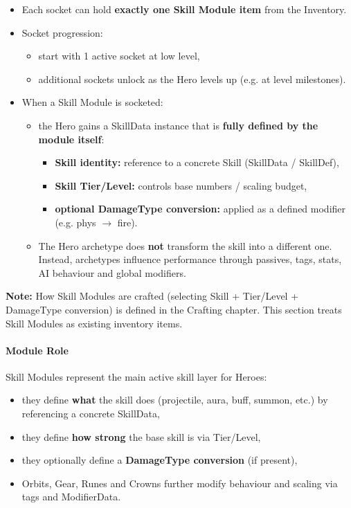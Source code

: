 \begin{itemize}
\begin{tabular}{llll}
	\end{tabular}
	\item Each socket can hold \textbf{exactly one Skill Module item} from the Inventory.
	\item Socket progression:
	\begin{itemize}
		\item start with 1 active socket at low level,
		\item additional sockets unlock as the Hero levels up (e.g. at level milestones).
	\end{itemize}
	\item When a Skill Module is socketed:
	\begin{itemize}
		\item the Hero gains a SkillData instance that is \textbf{fully defined by the module itself}:
		\begin{itemize}
			\item \textbf{Skill identity:} reference to a concrete Skill (SkillData / SkillDef),
			\item \textbf{Skill Tier/Level:} controls base numbers / scaling budget,
			\item \textbf{optional DamageType conversion:} applied as a defined modifier (e.g. phys $\rightarrow$ fire).
		\end{itemize}
		\item The Hero archetype does \textbf{not} transform the skill into a different one.
		Instead, archetypes influence performance through passives, tags, stats, AI behaviour and global modifiers.
	\end{itemize}
\end{itemize}

\noindent
\textbf{Note:} How Skill Modules are crafted (selecting Skill + Tier/Level + DamageType conversion) is defined in the Crafting chapter.
This section treats Skill Modules as existing inventory items.

\paragraph{Module Role}

Skill Modules represent the main active skill layer for Heroes:

\begin{itemize}
	\item they define \textbf{what} the skill does (projectile, aura, buff, summon, etc.) by referencing a concrete SkillData,
	\item they define \textbf{how strong} the base skill is via Tier/Level,
	\item they optionally define a \textbf{DamageType conversion} (if present),
	\item Orbits, Gear, Runes and Crowns further modify behaviour and scaling via tags and ModifierData.
\end{itemize}

